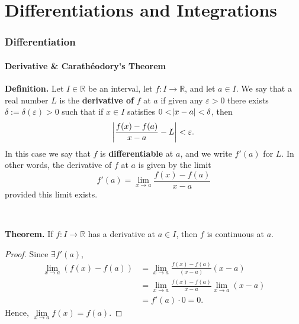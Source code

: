 \documentclass[12pt,a4paper]{article}
\begin{document}
\part{Differentiations and Integrations}
\section{Differentiation}
\subsection{Derivative \& Carath\'eodory's Theorem}

\begin{tcolorbox}[colback=white]
	\textbf{Definition.} Let $I\in\mathbb{R}$ be an interval, let $f:I\to\mathbb{R}$, and let $a\in I$. We say that a real number $L$ is the \textbf{derivative of} $f$ at $a$ if given any $\varepsilon>0$ there exists $\delta:=\delta(\varepsilon)>0$ such that if $x\in I$ satisfies $0<\abs{x-a}<\delta$, then \[
	\abs{\frac{f(x)-f(a)}{x-a}-L}<\varepsilon.
	\] In this case we say that $f$ is \textbf{differentiable} at $a$, and we write $f'(a)$ for $L$. In other words, the derivative of $f$ at $a$ is given by the limit \[
	f'(a)=\lim\limits_{x\to a}\frac{f(x)-f(a)}{x-a}
	\] provided this limit exists.
\end{tcolorbox}
\
\begin{tcolorbox}[colback=white]
	\textbf{Theorem.} If $f:I\to\mathbb{R}$ has a derivative at $a\in I$, then $f$ is continuous at $a$.\tcblower\begin{proof}
		Since $\exists f'(a)$, \begin{align*}
		\lim\limits_{x\to a}(f(x)-f(a)) &= \lim\limits_{x\to a}\frac{f(x)-f(a)}{(x-a)}(x-a) \\
		&=\lim\limits_{x\to a}\frac{f(x)-f(a)}{x-a}\lim\limits_{x\to a}(x-a) \\
		&=f'(a)\cdot 0 = 0.
		\end{align*} Hence, $\lim\limits_{x\to a}f(x)=f(a)$.
	\end{proof}
\end{tcolorbox}
\
\end{document}
